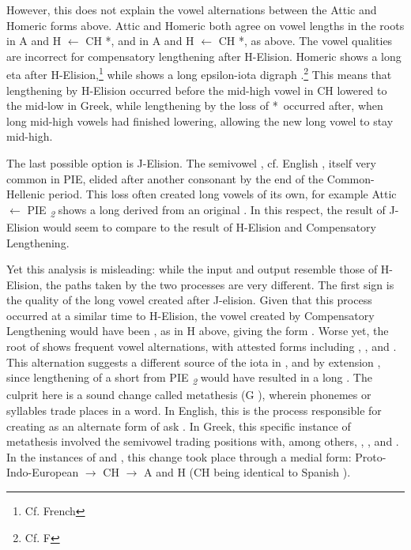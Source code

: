 However, this does not explain the vowel alternations between the Attic and Homeric forms above. Attic and Homeric both agree on vowel lengths in the roots  in A  and H  $\gets$ CH *,\autocite[]{Beekes_2009} and  in A and H  $\gets$ CH *, as above. The vowel qualities are incorrect for compensatory lengthening after H-Elision. Homeric  shows a long eta  after H-Elision,\footnote{Cf. French } while  shows a long epsilon-iota digraph .\footnote{Cf. F } This means that lengthening by H-Elision occurred before the mid-high vowel  in CH lowered to the mid-low  in Greek, while lengthening by the loss of *\w\ occurred after, when long mid-high vowels had finished lowering, allowing the new long vowel  to stay mid-high. 

The last possible option is J-Elision. The semivowel , cf. English , itself very common in PIE, elided after another consonant by the end of the Common-Hellenic period.\autocite[196]{Smyth_2013} This loss often created long vowels of its own, for example Attic  $\gets$ PIE \textit{\textsubscript{2}} shows a long  derived from an original  .\autocite[τείνω]{Beekes_2009} In this respect, the result of J-Elision would seem to compare to the result of H-Elision and Compensatory Lengthening.

Yet this analysis is misleading: while the input and output resemble those of H-Elision, the paths taken by the two processes are very different. The first sign is the quality of the long vowel created after J-elision. Given that this process occurred at a similar time to H-Elision, the vowel created by Compensatory Lengthening would have been , as in H  above, giving the form . Worse yet, the root of  shows frequent vowel alternations, with attested forms including , ,\autocite[τάνυται]{Beekes_2009} and .\autocite[τιταίνω]{Beekes_2009} This alternation suggests a different source of the iota  in , and by extension , since lengthening of a short  from PIE \textit{\textsubscript{2}} would have resulted in a long . The culprit here is a sound change called metathesis (G ), wherein phonemes or syllables trade places in a word. In English, this is the process responsible for creating  as an alternate form  of ask . In Greek, this specific instance of metathesis involved the semivowel  trading positions with,  among others, , , and . In the instances of  and , this change took place through a medial form: Proto-Indo-European  $\to$ CH  $\to$ A and H  (CH  being identical to Spanish ).

